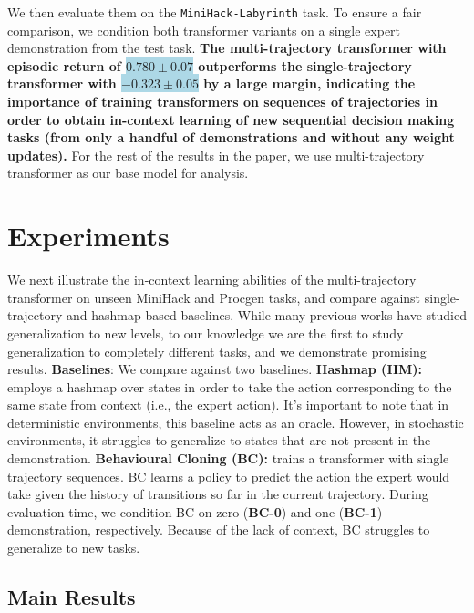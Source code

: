 \documentclass[]{fairmeta}
\begin{document}
We then evaluate them on the \texttt{MiniHack-Labyrinth} task. To ensure a fair comparison, we condition both transformer variants on a single expert demonstration from the test task.
\textbf{The multi-trajectory transformer with episodic return of \colorbox{lightblue}{\( 0.780 \pm 0.07 \)}
 outperforms the single-trajectory transformer with \colorbox{lightblue}{\(-0.323 \pm 0.05\)}  by a large margin, indicating the importance of training transformers on sequences of trajectories in order to obtain in-context learning of new sequential decision making tasks (from only a handful of demonstrations and without any weight updates).} For the rest of the results in the paper, we use multi-trajectory transformer as our base model for analysis.
\section{Experiments}
\label{sec:main_expts}
We next illustrate the in-context learning abilities of the multi-trajectory transformer on unseen MiniHack and Procgen tasks, and compare against single-trajectory and hashmap-based baselines. While many previous works have studied generalization to new levels, to our knowledge we are the first to study generalization to completely different tasks, and we demonstrate promising results.
\textbf{Baselines}: We compare against two baselines. \textbf{Hashmap (HM):} employs a hashmap over states in order to take the action corresponding to the same state from context (i.e., the expert action). It's important to note that in deterministic environments, this baseline acts as an oracle. However, in stochastic environments, it struggles to generalize to states that are not present in the demonstration. \textbf{Behavioural Cloning (BC):} trains a transformer with single trajectory sequences. BC learns a policy to predict the action the expert would take given the history of transitions so far in the current trajectory. During evaluation time, we condition BC on zero (\textbf{BC-0}) and one (\textbf{BC-1}) demonstration, respectively. Because of the lack of context, BC struggles to generalize to new tasks.
\subsection{Main Results}
\label{sec:main_results}
\end{document}

